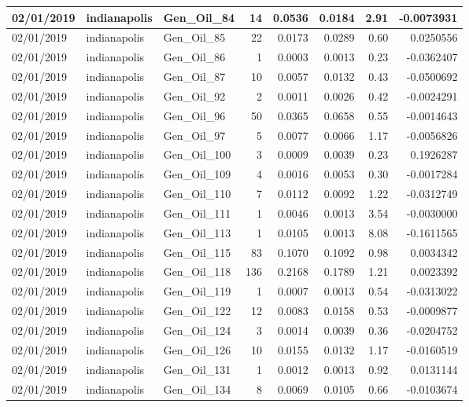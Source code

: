 \documentclass[
  letterpaper,
  DIV=11,
  numbers=noendperiod]{scrartcl}
\begin{document}
\begin{tabular}{l|l|l|r|r|r|r|r}
\hline
02/01/2019 & indianapolis & Gen\_Oil\_84 & 14 & 0.0536 & 0.0184 & 2.91 & -0.0073931\\
\hline
02/01/2019 & indianapolis & Gen\_Oil\_85 & 22 & 0.0173 & 0.0289 & 0.60 & 0.0250556\\
\hline
02/01/2019 & indianapolis & Gen\_Oil\_86 & 1 & 0.0003 & 0.0013 & 0.23 & -0.0362407\\
\hline
02/01/2019 & indianapolis & Gen\_Oil\_87 & 10 & 0.0057 & 0.0132 & 0.43 & -0.0500692\\
\hline
02/01/2019 & indianapolis & Gen\_Oil\_92 & 2 & 0.0011 & 0.0026 & 0.42 & -0.0024291\\
\hline
02/01/2019 & indianapolis & Gen\_Oil\_96 & 50 & 0.0365 & 0.0658 & 0.55 & -0.0014643\\
\hline
02/01/2019 & indianapolis & Gen\_Oil\_97 & 5 & 0.0077 & 0.0066 & 1.17 & -0.0056826\\
\hline
02/01/2019 & indianapolis & Gen\_Oil\_100 & 3 & 0.0009 & 0.0039 & 0.23 & 0.1926287\\
\hline
02/01/2019 & indianapolis & Gen\_Oil\_109 & 4 & 0.0016 & 0.0053 & 0.30 & -0.0017284\\
\hline
02/01/2019 & indianapolis & Gen\_Oil\_110 & 7 & 0.0112 & 0.0092 & 1.22 & -0.0312749\\
\hline
02/01/2019 & indianapolis & Gen\_Oil\_111 & 1 & 0.0046 & 0.0013 & 3.54 & -0.0030000\\
\hline
02/01/2019 & indianapolis & Gen\_Oil\_113 & 1 & 0.0105 & 0.0013 & 8.08 & -0.1611565\\
\hline
02/01/2019 & indianapolis & Gen\_Oil\_115 & 83 & 0.1070 & 0.1092 & 0.98 & 0.0034342\\
\hline
02/01/2019 & indianapolis & Gen\_Oil\_118 & 136 & 0.2168 & 0.1789 & 1.21 & 0.0023392\\
\hline
02/01/2019 & indianapolis & Gen\_Oil\_119 & 1 & 0.0007 & 0.0013 & 0.54 & -0.0313022\\
\hline
02/01/2019 & indianapolis & Gen\_Oil\_122 & 12 & 0.0083 & 0.0158 & 0.53 & -0.0009877\\
\hline
02/01/2019 & indianapolis & Gen\_Oil\_124 & 3 & 0.0014 & 0.0039 & 0.36 & -0.0204752\\
\hline
02/01/2019 & indianapolis & Gen\_Oil\_126 & 10 & 0.0155 & 0.0132 & 1.17 & -0.0160519\\
\hline
02/01/2019 & indianapolis & Gen\_Oil\_131 & 1 & 0.0012 & 0.0013 & 0.92 & 0.0131144\\
\hline
02/01/2019 & indianapolis & Gen\_Oil\_134 & 8 & 0.0069 & 0.0105 & 0.66 & -0.0103674\\

\end{tabular}
\end{document}
